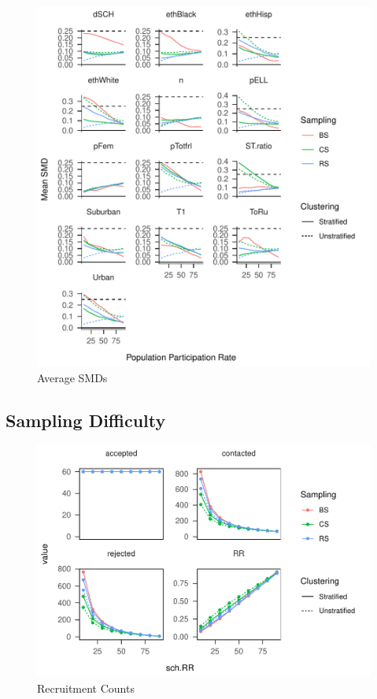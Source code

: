 \documentclass[man,floatsintext]{apa6}
\begin{document}
\begin{figure}
\centering
\includegraphics{Results_files/figure-latex/unnamed-chunk-8-1.pdf}
\caption{\label{fig:unnamed-chunk-8}Average SMDs}
\end{figure}

\hypertarget{sampling-difficulty}{%
\subsection{Sampling Difficulty}\label{sampling-difficulty}}

\begin{figure}
\centering
\includegraphics{Results_files/figure-latex/unnamed-chunk-10-1.pdf}
\caption{\label{fig:unnamed-chunk-10}Recruitment Counts}
\end{figure}
\end{document}
